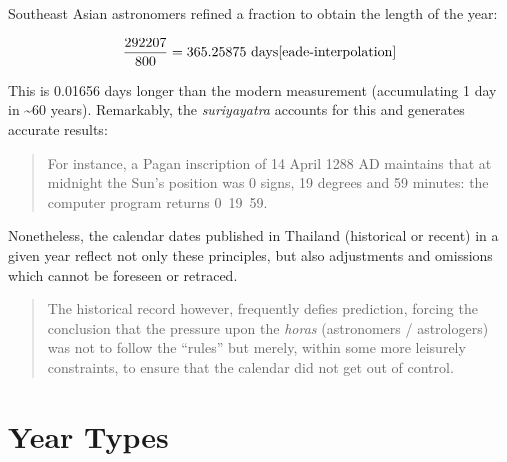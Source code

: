 \documentclass[11pt,oneside]{memoir-article}
\begin{document}
Southeast Asian astronomers refined a fraction to obtain the length of
the year:

\begin{equation}
\frac{292207}{800} = 365.25875\ \text{days}\cite{eade-interpolation}
\end{equation}

This is 0.01656 days longer than the modern measurement (accumulating
1 day in \textasciitilde{}60 years). Remarkably, the \emph{suriyayatra} accounts for this
and generates accurate results:

\begin{quote}
For instance, a Pagan inscription of 14 April 1288 AD maintains that
at midnight the Sun's position was 0 signs, 19 degrees and 59 minutes:
the computer program returns
0~19~59.\cite{eade-calendrical}
\end{quote}

Nonetheless, the calendar dates published in Thailand (historical or
recent) in a given year reflect not only these principles, but also
adjustments and omissions which cannot be foreseen or retraced.

\begin{quote}
The historical record however, frequently defies prediction, forcing
the conclusion that the pressure upon the \emph{horas} (astronomers /
astrologers) was not to follow the ``rules'' but merely, within some
more leisurely constraints, to ensure that the calendar did not get
out of control.\cite{eade-calendrical}
\end{quote}

\clearpage

\section{Year Types}
\label{sec-3-1}
\end{document}
